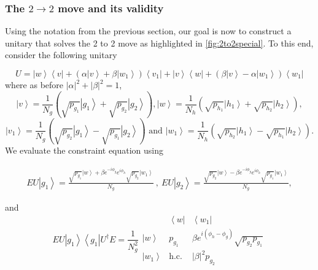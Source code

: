 \documentclass{article}
\newcommand{\atul}[1]{#1} %
\begin{document}
\subsubsection{The \texorpdfstring{$2\to2$}{2 -> 2} move and its validity}\label{subsubsec:2to2}
\atul{Using the notation from the previous section, our goal is now to construct a unitary that solves the 2 to 2 move as highlighted in  \cref{fig:2to2special}. To this end, consider the following unitary} %

%
\begin{displaymath}
  U=\left|w\right\rangle \left\langle v\right|+\left(\alpha\left|v\right\rangle +\beta\left|w_{1}\right\rangle \right)\left\langle v_{1}\right|+\left|v\right\rangle \left\langle w\right|+\left(\beta\left|v\right\rangle -\alpha\left|w_{1}\right\rangle \right)\left\langle w_{1}\right|
\end{displaymath}
where as before $\left|\alpha\right|^{2}+\left|\beta\right|^{2}=1$,
\begin{displaymath}
  \left|v\right\rangle =\frac{1}{N_{g}}\left(\sqrt{p_{g_{1}}}\left|g_{1}\right\rangle +\sqrt{p_{g_{2}}}\left|g_{2}\right\rangle \right),
  \left|w\right\rangle =\frac{1}{N_{h}}\left(\sqrt{p_{h_{1}}}\left|h_{1}\right\rangle +\sqrt{p_{h_{2}}}\left|h_{2}\right\rangle \right),
\end{displaymath}
\begin{displaymath}
  \left|v_{1}\right\rangle =\frac{1}{N_{g}}\left(\sqrt{p_{g_{2}}}\left|g_{1}\right\rangle -\sqrt{p_{g_{1}}}\left|g_{2}\right\rangle \right) \text{ and }
  \left|w_{1}\right\rangle =\frac{1}{N_{h}}\left(\sqrt{p_{h_{2}}}\left|h_{1}\right\rangle -\sqrt{p_{h_{1}}}\left|h_{2}\right\rangle \right).
\end{displaymath}
We evaluate the constraint equation using
\begin{footnotesize}
  \begin{align*}
    EU\left|g_{1}\right\rangle   =\frac{\sqrt{p_{g_{1}}}\left|w\right\rangle +\beta e^{-i\phi_{g}}e^{i\phi_{h}}\sqrt{p_{g_{2}}}\left|w_{1}\right\rangle }{N_{g}}\ , \
    EU\left|g_{2}\right\rangle   =\frac{\sqrt{p_{g_{2}}}\left|w\right\rangle -\beta e^{-i\phi_{g}}e^{i\phi_{h}}\sqrt{p_{g_{1}}}\left|w_{1}\right\rangle }{N_{g}},
  \end{align*}
\end{footnotesize}
and
\begin{displaymath}
  EU\left|g_{1}\right\rangle \left\langle g_{1}\right|U^{\dagger}E=\frac{1}{N_{g}^{2}}\begin{array}{c|cc}
                                & \left\langle w\right| & \left\langle w_{1}\right|                               \\
    \hline \left|w\right\rangle & p_{g_{1}}             & \beta e^{i(\phi_{h}-\phi_{g})}\sqrt{p_{g_{2}}p_{g_{1}}} \\
    \left|w_{1}\right\rangle    & \text{h.c.}           & \left|\beta\right|^{2}p_{g_{2}}
  \end{array}
\end{displaymath}
\end{document}
